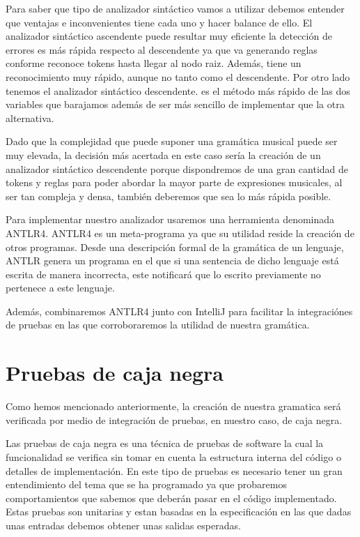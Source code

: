 \documentclass{article}
\begin{document}
Para saber que tipo de analizador sintáctico vamos a utilizar debemos entender que ventajas e inconvenientes tiene cada
uno y hacer balance de ello. El analizador sintáctico ascendente puede resultar muy eficiente la detección de errores es
más rápida respecto al descendente ya que va generando reglas conforme reconoce tokens hasta llegar al nodo raiz. Además, tiene
un reconocimiento muy rápido, aunque no tanto como el descendente. Por otro lado tenemos el analizador sintáctico descendente.
es el método más rápido de las dos variables que barajamos además de ser más sencillo de implementar que la otra alternativa.

Dado que la complejidad que puede suponer una gramática musical puede ser muy elevada, la decisión más acertada en este
caso sería la creación de un analizador sintáctico descendente porque dispondremos de una gran cantidad de tokens y reglas
para poder abordar la mayor parte de expresiones musicales, al ser tan compleja y densa, también deberemos que sea lo más
rápida posible.

Para implementar nuestro analizador usaremos una herramienta denominada ANTLR4\cite{antlr4}. ANTLR4 es un meta-programa
ya que su utilidad reside la creación de otros programas. Desde una descripción formal de la gramática de un lenguaje,
ANTLR genera un programa en el que si una sentencia de dicho lenguaje está escrita de manera incorrecta, este notificará
que lo escrito previamente no pertenece a este lenguaje.

Además, combinaremos ANTLR4 junto con IntelliJ para facilitar la integraciónes de pruebas en las que corroboraremos la utilidad
de nuestra gramática.

\section{Pruebas de caja negra}
Como hemos mencionado anteriormente, la creación de nuestra gramatica será verificada por medio de integración de pruebas,
en nuestro caso, de caja negra.

Las pruebas de caja negra es una técnica de pruebas de software la cual la funcionalidad se verifica sin tomar en cuenta
la estructura interna del código o detalles de implementación. En este tipo de pruebas es necesario tener un gran entendimiento
del tema que se ha programado ya que probaremos comportamientos que sabemos que deberán pasar en el código implementado.
Estas pruebas son unitarias y estan basadas en la especificación en las que dadas unas entradas debemos obtener unas salidas esperadas.
\end{document}
